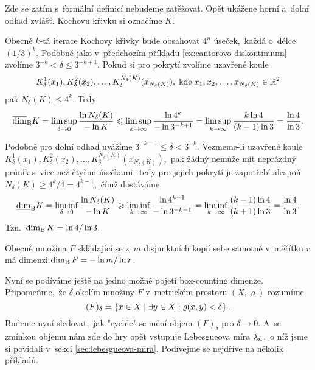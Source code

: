 \begin{example}\label{ex:kochova-krivka}
    Zde se zatím s~formální definicí nebudeme zatěžovat. Opět ukážene horní a~dolní odhad zvlášť. Kochovu křivku si označíme $K$.

    Obecně $k$-tá iterace Kochovy křivky bude obsahovat $4^n$ úseček,~každá o~délce $(1/3)^k$. Podobně jako v~předchozím příkladu \ref{ex:cantorovo-diskontinuum} zvolíme $3^{-k}<\delta\leqslant 3^{-k+1}$. Pokud si pro pokrytí zvolíme uzavřené koule
    \[K_\delta^1(x_1),K_\delta^2(x_2),\ldots,K_\delta^{N_\delta(K)}(x_{N_\delta(K)}),\;\text{kde}\;x_1,x_2,\ldots,x_{N_\delta(K)}\in\mathbb{R}^2\]
    pak $N_\delta(K)\leqslant 4^k$. Tedy
    \[\overline{\dim}_\textup{B}{K}=\limsup_{\delta\to 0}\dfrac{\ln{N_\delta(K)}}{-\ln{K}}\leqslant\limsup_{k\to\infty}\dfrac{\ln{4^k}}{-\ln{3^{-k+1}}}=\limsup_{k\to\infty}\dfrac{k\ln{4}}{(k-1)\ln{3}}=\dfrac{\ln{4}}{\ln{3}}.\]

    Podobně pro dolní odhad uvážíme $3^{-k-1}\leqslant\delta<3^{-k}$. Vezmeme-li uzavřené koule $K_\delta^1(x_1),K_\delta^2(x_2),\ldots,K_\delta^{N_\delta(K)}(x_{N_\delta(K)})$,~pak žádný nemůže mít neprázdný průnik s~více než čtyřmi úsečkami,~tedy pro jejich pokrytí je zapotřebí alespoň $N_\delta(K)\geqslant 4^k/4=4^{k-1}$,~čímž dostáváme
    \[\underline{\dim}_\textup{B}{K}=\liminf_{\delta\to 0}\dfrac{\ln{N_\delta(K)}}{-\ln{K}}\geqslant\liminf_{k\to\infty}\dfrac{\ln{4^{k-1}}}{-\ln{3^{-k-1}}}=\liminf_{k\to\infty}\dfrac{(k-1)\ln{4}}{(k+1)\ln{3}}=\dfrac{\ln{4}}{\ln{3}}.\]
    Tzn.~$\operatorname{dim_B}{K}=\ln{4}/\ln{3}$.
\end{example}
\begin{remark}
    Obecně množina $F$ skládající se z~$m$ disjunktních kopií sebe samotné v~měřítku $r$ má dimenzi $\operatorname{dim_B}{F}=-\ln{m}/\ln{r}$.
\end{remark}
Nyní se podíváme ještě na jedno možné pojetí box-counting dimenze. Připomeňme,~že $\delta$-okolím množiny $F$ v~metrickém prostoru $(X,\varrho)$ rozumíme
\[(F)_\delta=\left\{x\in X\mid\exists y\in X: \varrho(x,y)<\delta\right\}.\]
Budeme nyní sledovat,~jak "rychle" se mění objem $(F)_\delta$ pro $\delta\to 0$. A~se zmínkou objemu nám zde do hry opět vstupuje Lebesgueova míra $\lambda_n$,~o níž jsme si povídali v~sekci \ref{sec:lebesgueova-mira}. Podívejme se nejdříve na několik příkladů.
